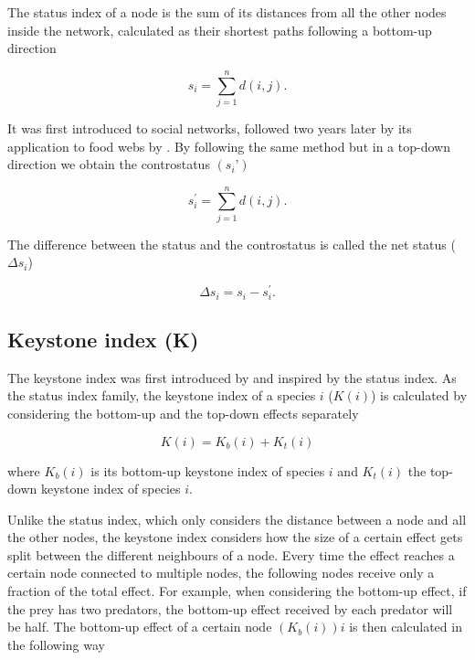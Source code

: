\documentclass[twocolumn]{article}
\begin{document}
		The status index of a node is the sum of its distances from all the other nodes inside the network, calculated as their shortest paths following a bottom-up direction \citep{Endredi2018}

						\begin{equation}
							s_i=\sum_{j=1}^{n}d\left(i,j\right).
						\end{equation}

		It was first introduced to social networks, followed two years later by its application to food webs by \citet{Harary1959, Harary1961}. By following the same method but in a top-down direction we obtain the controstatus $(s_i’)$

						\begin{equation}
							s_i^\prime=\sum_{j=1}^{n}d\left(i,j\right).
						\end{equation}

		The difference between the status and the controstatus is called the net status ($\Delta s_i$)

						\begin{equation}
							\Delta s_i=s_i-s_i^\prime.
						\end{equation}

	\subsection*{Keystone index (K)}

		The keystone index was first introduced by \citet{Jordan1999} and inspired by the status index. As the status index family, the keystone index of a species $i$ ($K(i)$) is calculated by considering the bottom-up and the top-down effects separately \citet{Jordan2006}

						\begin{equation}
							K\left(i\right)=K_b\left(i\right)+K_t\left(i\right)
						\end{equation}

		\noindent where $K_b\left(i\right)$ is its bottom-up keystone index of species $i$ and $K_t\left(i\right)$ the top-down keystone index of species $i$.

		Unlike the status index, which only considers the distance between a node and all the other nodes, the keystone index considers how the size of a certain effect gets split between the different neighbours of a node. Every time the effect reaches a certain node connected to multiple nodes, the following nodes receive only a fraction of the total effect. For example, when considering the bottom-up effect, if the prey has two predators, the bottom-up effect received by each predator will be half. The bottom-up effect of a certain node $(K_b\left(i\right))i$ is then calculated in the following way
\end{document}
